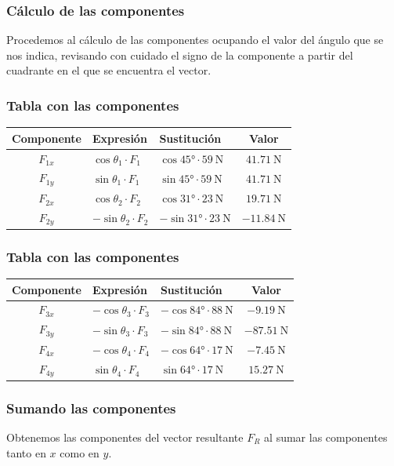 \documentclass[12pt]{beamer}
\begin{document}
\begin{frame}
\frametitle{Cálculo de las componentes}
Procedemos al cálculo de las componentes ocupando el valor del ángulo que se nos indica, revisando con cuidado el signo de la componente a partir del cuadrante en el que se encuentra el vector.
\end{frame}
\begin{frame}
\frametitle{Tabla con las componentes}
\begin{table}
\centering
\begin{tabular}{c | l | l | c}
Componente & Expresión & Sustitución & Valor \\ \hline
$F_{1x}$ & $\cos \theta_{1} \cdot F_{1}$ & $\cos \ang{45} \cdot \SI{59}{\newton}$ & $\SI{41.71}{\newton}$ \\ \hline
$F_{1y}$ & $\sin \theta_{1} \cdot F_{1}$ & $\sin \ang{45} \cdot \SI{59}{\newton}$ & $\SI{41.71}{\newton}$ \\ \hline
$F_{2x}$ & $\cos \theta_{2} \cdot F_{2}$ & $\cos \ang{31} \cdot \SI{23}{\newton}$ & $\SI{19.71}{\newton}$ \\ \hline
$F_{2y}$ & $-\sin \theta_{2} \cdot F_{2}$ & $-\sin \ang{31} \cdot \SI{23}{\newton}$ & $-\SI{11.84}{\newton}$ \\ \hline
\end{tabular}
\end{table}
\end{frame}
\begin{frame}
\frametitle{Tabla con las componentes}
\begin{table}
\centering
\begin{tabular}{c | l | l | c}
Componente & Expresión & Sustitución & Valor \\ \hline
$F_{3x}$ & $-\cos \theta_{3} \cdot F_{3}$ & $-\cos \ang{84} \cdot \SI{88}{\newton}$ & $-\SI{9.19}{\newton}$ \\ \hline
$F_{3y}$ & $-\sin \theta_{3} \cdot F_{3}$ & $-\sin \ang{84} \cdot \SI{88}{\newton}$ & $-\SI{87.51}{\newton}$ \\ \hline
$F_{4x}$ & $-\cos \theta_{4} \cdot F_{4}$ & $-\cos \ang{64} \cdot \SI{17}{\newton}$ & $-\SI{7.45}{\newton}$ \\ \hline
$F_{4y}$ & $\sin \theta_{4} \cdot F_{4}$ & $\sin \ang{64} \cdot \SI{17}{\newton}$ & $\SI{15.27}{\newton}$ \\ \hline
\end{tabular}
\end{table}
\end{frame}
\begin{frame}
\frametitle{Sumando las componentes}
Obtenemos las componentes del vector resultante $F_{R}$ al sumar las componentes tanto en $x$ como en $y$.
\end{frame}
\end{document}

